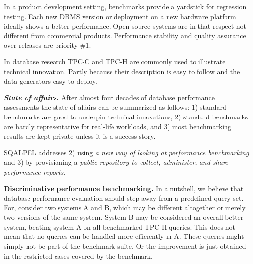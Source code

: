 \documentclass{cidr-2019}
\begin{document}
In a product development setting, benchmarks provide a yardstick for
regression testing.  Each new DBMS version or deployment on a new
hardware platform ideally shows a better performance.
Open-source systems are in that respect not different from commercial products. Performance stability and quality assurance over releases are priority \#1.

In database research TPC-C and TPC-H are commonly used to illustrate technical innovation.
Partly because their description is easy to follow and the data generators easy to deploy.

\emph{\bf State of affairs.} After almost four decades of database performance assessments the state of affairs can be summarized as 
follows: 1) standard benchmarks are good to underpin technical innovations, 
2) standard benchmarks are hardly representative for real-life workloads\cite{DBLP:conf/sigmod/VogelsgesangHFK18}, 
and 3) most benchmarking results are kept private unless it is a success story.

{\sc SQALPEL} addresses
2) using \emph{a new way of looking at performance benchmarking}
and 3) by provisioning a \emph{public repository to collect, administer, and share
performance reports}.


{\bf Discriminative performance benchmarking.} 
In a nutshell, we believe that database performance evaluation should step away from 
a predefined query set.
For, consider two systems A and B, which may be different altogether or merely two versions of the
same system. System B may be considered an overall better system, beating system
A on all benchmarked TPC-H queries. This does not mean
that no queries can be handled more efficiently in A. These queries might
simply not be part of the benchmark suite. Or the improvement is just obtained in
the restricted cases covered by the benchmark.
\end{document}
